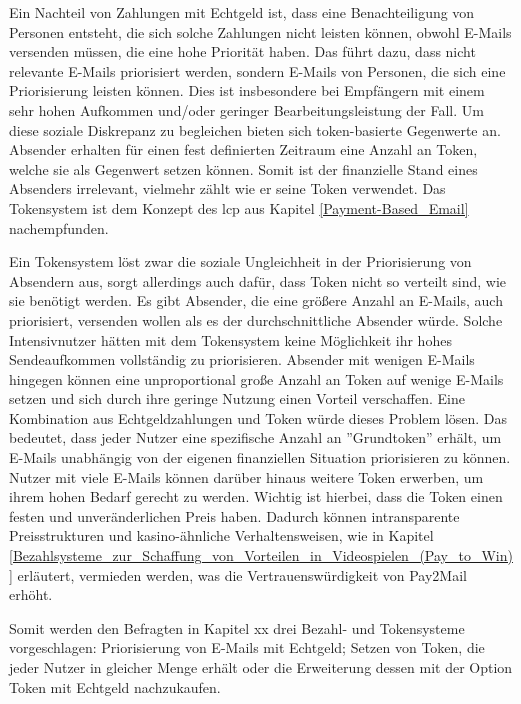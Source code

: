 Ein Nachteil von Zahlungen mit Echtgeld ist, dass eine Benachteiligung von Personen entsteht, die sich solche Zahlungen nicht leisten können, obwohl E-Mails versenden müssen, die eine hohe Priorität haben. Das führt dazu, dass nicht relevante E-Mails priorisiert werden, sondern E-Mails von Personen, die sich eine Priorisierung leisten können. Dies ist insbesondere bei Empfängern mit einem sehr hohen Aufkommen und/oder geringer Bearbeitungsleistung der Fall. Um diese soziale Diskrepanz zu begleichen bieten sich token-basierte Gegenwerte an. Absender erhalten für einen fest definierten Zeitraum eine Anzahl an Token, welche sie als Gegenwert setzen können. Somit ist der finanzielle Stand eines Absenders irrelevant, vielmehr zählt wie er seine Token verwendet. Das Tokensystem ist dem Konzept des \acrshort{lcp} aus Kapitel \ref{Payment-Based_Email} nachempfunden. 

Ein Tokensystem löst zwar die soziale Ungleichheit in der Priorisierung von Absendern aus, sorgt allerdings auch dafür, dass Token nicht so verteilt sind, wie sie benötigt werden. Es gibt Absender, die eine größere Anzahl an E-Mails, auch priorisiert, versenden wollen als es der durchschnittliche Absender würde. Solche Intensivnutzer hätten mit dem Tokensystem keine Möglichkeit ihr hohes Sendeaufkommen vollständig zu priorisieren. Absender mit wenigen E-Mails hingegen können eine unproportional große Anzahl an Token auf wenige E-Mails setzen und sich durch ihre geringe Nutzung einen Vorteil verschaffen. Eine Kombination aus Echtgeldzahlungen und Token würde dieses Problem lösen. Das bedeutet, dass jeder Nutzer eine spezifische Anzahl an ''Grundtoken'' erhält, um E-Mails unabhängig von der eigenen finanziellen Situation priorisieren zu können. Nutzer mit viele E-Mails können darüber hinaus weitere Token erwerben, um ihrem hohen Bedarf gerecht zu werden. Wichtig ist hierbei, dass die Token einen festen und unveränderlichen Preis haben. Dadurch können intransparente Preisstrukturen und kasino-ähnliche Verhaltensweisen, wie in Kapitel \ref{Bezahlsysteme_zur_Schaffung_von_Vorteilen_in_Videospielen_(Pay_to_Win)} erläutert, vermieden werden, was die Vertrauenswürdigkeit von Pay2Mail erhöht.

Somit werden den Befragten in Kapitel xx drei Bezahl- und Tokensysteme vorgeschlagen: Priorisierung von E-Mails mit Echtgeld; Setzen von Token, die jeder Nutzer in gleicher Menge erhält oder die Erweiterung dessen mit der Option Token mit Echtgeld nachzukaufen.


